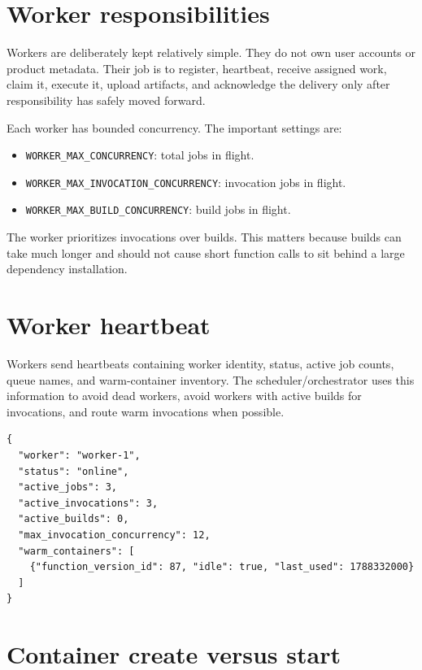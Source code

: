 \documentclass[12pt,a4paper]{report}
\newcommand{\file}[1]{\texttt{#1}}
\begin{document}
\section{Worker responsibilities}

Workers are deliberately kept relatively simple. They do not own user accounts
or product metadata. Their job is to register, heartbeat, receive assigned
work, claim it, execute it, upload artifacts, and acknowledge the delivery only
after responsibility has safely moved forward.

Each worker has bounded concurrency. The important settings are:

\begin{itemize}[leftmargin=1.2cm]
  \item \file{WORKER\_MAX\_CONCURRENCY}: total jobs in flight.
  \item \file{WORKER\_MAX\_INVOCATION\_CONCURRENCY}: invocation jobs in flight.
  \item \file{WORKER\_MAX\_BUILD\_CONCURRENCY}: build jobs in flight.
\end{itemize}

The worker prioritizes invocations over builds. This matters because builds
can take much longer and should not cause short function calls to sit behind a
large dependency installation.

\section{Worker heartbeat}

Workers send heartbeats containing worker identity, status, active job counts,
queue names, and warm-container inventory. The scheduler/orchestrator uses this
information to avoid dead workers, avoid workers with active builds for
invocations, and route warm invocations when possible.

\begin{lstlisting}[caption={Simplified worker heartbeat data.}]
{
  "worker": "worker-1",
  "status": "online",
  "active_jobs": 3,
  "active_invocations": 3,
  "active_builds": 0,
  "max_invocation_concurrency": 12,
  "warm_containers": [
    {"function_version_id": 87, "idle": true, "last_used": 1788332000}
  ]
}
\end{lstlisting}

\section{Container create versus start}
\end{document}
